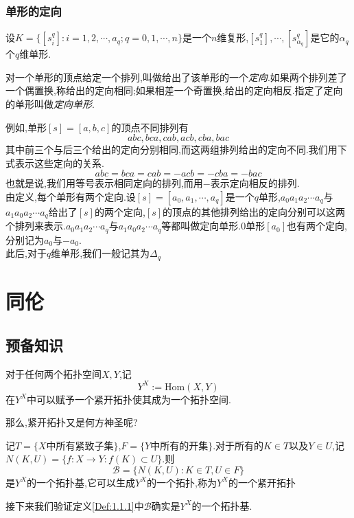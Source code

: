 \documentclass{article}
\begin{document}
\subsubsection{单形的定向}
设$K = \{[s_i^q]: i = 1,2,\cdots,a_q;q = 0,1,\cdots,n\}$是一个$n$维复形,$[s_1^q],\cdots,[s^q_{\alpha_q}]$是它的$\alpha_q$个$q$维单形.
\begin{definition}
    对一个单形的顶点给定一个排列,叫做给出了该单形的一个\emph{定向}.如果两个排列差了一个偶置换,称给出的定向相同;如果相差一个奇置换,给出的定向相反.指定了定向的单形叫做\emph{定向单形}.
\end{definition}
例如,单形$[s] = [a,b,c]$的顶点不同排列有
$$
abc,bca,cab,acb,cba,bac
$$
其中前三个与后三个给出的定向分别相同,而这两组排列给出的定向不同.我们用下式表示这些定向的关系.
$$
abc = bca = cab  = -acb = -cba = -bac
$$
也就是说,我们用等号表示相同定向的排列,而用$-$表示定向相反的排列.\\
由定义,每个单形有两个定向.设$[s] = [a_0,a_1,\cdots,a_q]$是一个$q$单形,$a_0a_1a_2\cdots a_q$与$a_1a_0a_2\cdots a_q$给出了$[s]$的两个定向,$[s]$的顶点的其他排列给出的定向分别可以这两个排列来表示.$a_0a_1a_2\cdots a_q$与$a_1a_0a_2\cdots a_q$等都叫做定向单形.0单形$[a_0]$也有两个定向,分别记为$a_0$与$-a_0$.\\
此后,对于$q$维单形,我们一般记其为$\Delta_q$
\newpage
\section{同伦}
\subsection{预备知识}
对于任何两个拓扑空间$X,Y$,记
$$
Y^X := \text{Hom}(X,Y)
$$
在$Y^X$中可以赋予一个紧开拓扑使其成为一个拓扑空间.


那么,紧开拓扑又是何方神圣呢?
\begin{definition}
    记$T = \{X\text{中所有紧致子集}\}$,$F = \{Y\text{中所有的开集}\}$.对于所有的$K \in T$以及$Y \in U$,记$N(K,U) = \{f: X \to Y : f(K)\subset U\}$.则
    $$
    \mathscr{B} = \{N(K,U) : K \in T, U \in F\}
    $$
    是$Y^X$的一个拓扑基,它可以生成$Y^X$的一个拓扑,称为$Y^X$的一个紧开拓扑
    \label{Def:1.1.1}
\end{definition}

接下来我们验证定义\ref{Def:1.1.1}中$\mathscr{B}$确实是$Y^X$的一个拓扑基.
\end{document}
